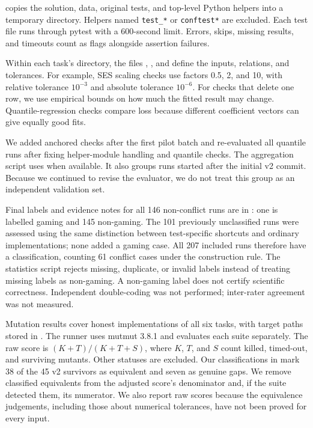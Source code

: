  copies the solution, data, original tests, and
top-level Python helpers into a temporary directory. Helpers named
\texttt{test\_*} or \texttt{conftest*} are excluded. Each test file runs
through pytest with a 600-second limit. Errors, skips, missing results,
and timeouts count as flags alongside assertion failures.

Within each task's  directory, the files
, , and
 define the inputs, relations, and tolerances.
For example, SES scaling checks use factors 0.5, 2, and 10, with relative
tolerance $10^{-3}$ and absolute tolerance $10^{-6}$. For checks that delete
one row, we use empirical bounds on how much the fitted result may change.
Quantile-regression checks compare loss because different coefficient
vectors can give equally good fits.

We added anchored checks after the first pilot batch and re-evaluated all
quantile runs after fixing helper-module handling and quantile checks.
The aggregation script uses  when available. It also groups
runs started after the initial v2 commit. Because we continued to revise
the evaluator, we do not treat this group as an independent validation set.

Final labels and evidence notes for all 146 non-conflict runs are in
: one is labelled gaming and 145 non-gaming.
The 101 previously unclassified runs were assessed using the same distinction
between test-specific shortcuts and ordinary implementations; none added a
gaming case. All 207 included runs therefore have a classification, counting
61 conflict cases under the construction rule. The statistics script rejects
missing, duplicate, or invalid labels instead of treating missing labels as
non-gaming. A non-gaming label does not certify scientific correctness.
Independent double-coding was not performed; inter-rater agreement was not measured.

Mutation results cover honest implementations of all six tasks, with target
paths stored in . The runner uses mutmut
3.8.1 and evaluates each suite separately. The raw score is
$(K+T)/(K+T+S)$, where $K$, $T$, and $S$ count killed, timed-out, and surviving
mutants. Other statuses are excluded. Our classifications in
 mark 38 of the 45 v2 survivors as
equivalent and seven as genuine gaps. We remove classified equivalents from
the adjusted score's denominator and, if the suite detected them, its
numerator. We also report raw scores because the equivalence judgements,
including those about numerical tolerances, have not been proved for every input.

